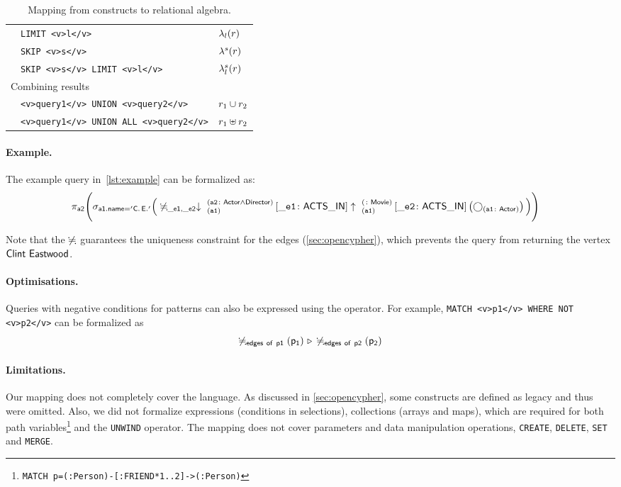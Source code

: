 \begin{table}[htbp]
\begin{tabular}{|l|l|l|}
		& \lstinline+LIMIT <v>l</v>+ & $\lambda_{l}(r)$ \\ \cline{2-3}

		& \lstinline+SKIP <v>s</v>+ & $\lambda^{s}(r)$ \\ \cline{2-3}

		& \lstinline+SKIP <v>s</v> LIMIT <v>l</v>+ & $\lambda_{l}^{s}(r)$ \\ \cline{2-3}

		\hline \multicolumn{3}{|l|}{Combining results } \\ \cline{2-3}

		& \lstinline+<v>query1</v> UNION <v>query2</v>+ & $r_1 \cup r_2$ \\ \cline{2-3}

		& \lstinline+<v>query1</v> UNION ALL <v>query2</v>+ & $r_1 \uplus r_2$ \\ \hline
	\end{tabular}
	\caption{Mapping from \opencypher constructs to relational algebra.}
	\label{table:mapping}
\end{table}

\paragraph{Example.} The example query in~\autoref{lst:example} can be formalized as:
{\footnotesize
	\begin{align*}
	&\projection{a2} \Bigg(\selection{a1.name = 'C.\,E.'} \Big( \alldifferent{\_e1, \_e2} \expandin{a1}{a2}{Actor \land Director}{\_e1}{ACTS\_IN}{1}{1} \expandout{a1}{}{Movie}{\_e2}{ACTS\_IN}{1}{1} \left(\getvertices{a1}{Actor}\right) \Big) \Bigg)
	\end{align*}
}

Note that the $\not\fallingdotseq$ guarantees the uniqueness constraint for the edges (\autoref{sec:opencypher}), which prevents the query from returning the vertex $\mathsf{Clint~Eastwood}$.

\paragraph{Optimisations.} Queries with negative conditions for patterns can also be expressed using the \antijointext operator. For example, \lstinline+MATCH <v>p1</v> WHERE NOT <v>p2</v>+ can be formalized as
$$\not\fallingdotseq_{\mathsf{\mathsf{edges~of~p1}}} \left(\mathsf{p_1}\right) \, \triangleright \, \not\fallingdotseq_{\mathsf{\mathsf{edges~of~p2}}} \left(\mathsf{p_2}\right)$$

\paragraph{Limitations.} Our mapping does not completely cover the \opencypher language. As discussed in \autoref{sec:opencypher}, some constructs are defined as legacy and thus were omitted. Also, we did not formalize expressions (\eg  conditions in selections), collections (arrays and maps), which are required for both path variables\footnote{\lstinline+MATCH p=(:Person)-[:FRIEND*1..2]->(:Person)+} and the \lstinline+UNWIND+ operator. The mapping does not cover parameters and data manipulation operations, \eg \lstinline+CREATE+, \lstinline+DELETE+, \lstinline+SET+ and \lstinline+MERGE+.
